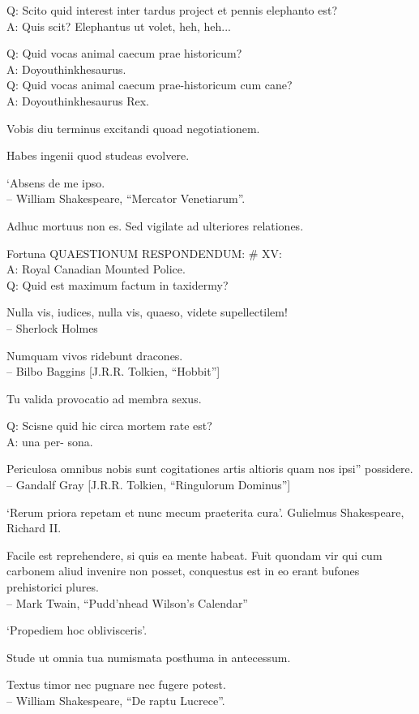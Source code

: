 \documentclass[titlepage,12pt]{memoir}
\begin{document}
Q: Scito quid interest inter tardus project
et pennis elephanto est?\\
A: Quis scit? Elephantus ut volet, heh, heh...

Q: Quid vocas animal caecum prae historicum?\\
A: Doyouthinkhesaurus.\\
Q: Quid vocas animal caecum prae-historicum cum cane?\\
A: Doyouthinkhesaurus Rex.

Vobis diu terminus excitandi quoad negotiationem.

Habes ingenii quod studeas evolvere.

‘Absens de me ipso.
\\-- William Shakespeare, “Mercator Venetiarum”.

Adhuc mortuus non es. Sed vigilate ad ulteriores relationes.

Fortuna QUAESTIONUM RESPONDENDUM: \# XV:\\
A: Royal Canadian Mounted Police.
\\Q: Quid est maximum factum in taxidermy?

Nulla vis, iudices, nulla vis, quaeso, videte supellectilem!
\\-- Sherlock Holmes

Numquam vivos ridebunt dracones.
\\-- Bilbo Baggins [J.R.R. Tolkien, “Hobbit”]

Tu valida provocatio ad membra sexus.

Q: Scisne quid hic circa mortem rate est?\\
A: una per- sona.

Periculosa omnibus nobis sunt cogitationes artis altioris quam nos ipsi”
possidere.
\\-- Gandalf Gray [J.R.R. Tolkien, “Ringulorum Dominus”]

‘Rerum priora repetam et nunc mecum praeterita cura’.
Gulielmus Shakespeare, Richard II.

Facile est reprehendere, si quis ea mente habeat. Fuit quondam vir
qui cum carbonem aliud invenire non posset, conquestus est
in eo erant bufones prehistorici plures.
\\-- Mark Twain, “Pudd’nhead Wilson’s Calendar”

‘Propediem hoc oblivisceris’.

Stude ut omnia tua numismata posthuma in antecessum.

Textus timor nec pugnare nec fugere potest.
\\-- William Shakespeare, “De raptu Lucrece”.
\end{document}
